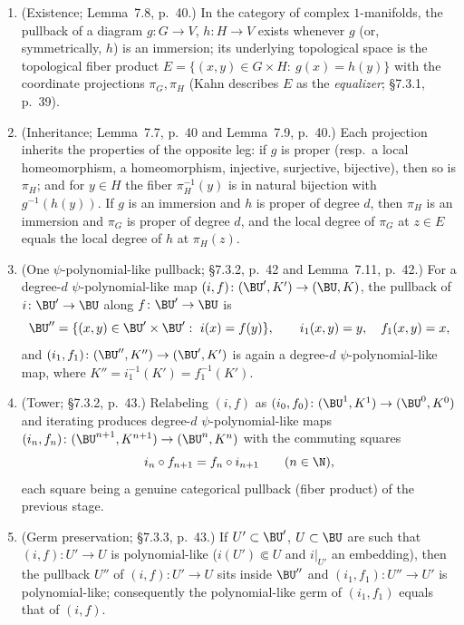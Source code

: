 \begin{proposition}\label{prop:kahn-pullback-tower}
\begin{enumerate}
\item (Existence; Lemma~7.8, p.~40.)  In the category of complex
\(1\)-manifolds, the pullback of a diagram \(g\colon G\to V\),
\(h\colon H\to V\) exists whenever \(g\) (or, symmetrically, \(h\)) is
an immersion; its underlying topological space is the topological
fiber product
\(E=\{(x,y)\in G\times H:\ g(x)=h(y)\}\)
with the coordinate projections \(\pi_G,\pi_H\) (Kahn describes \(E\)
as the \emph{equalizer}; \S7.3.1, p.~39).
\item (Inheritance; Lemma~7.7, p.~40 and Lemma~7.9, p.~40.)  Each projection inherits
the properties of the opposite leg: if \(g\) is proper (resp.\ a local
homeomorphism, a homeomorphism, injective, surjective, bijective),
then so is \(\pi_H\); and for \(y\in H\) the fiber \(\pi_H^{-1}(y)\)
is in natural bijection with \(g^{-1}(h(y))\).  If \(g\) is an
immersion and \(h\) is proper of degree \(d\), then \(\pi_H\) is an
immersion and \(\pi_G\) is proper of degree \(d\), and the local
degree of \(\pi_G\) at \(z\in E\) equals the local degree of \(h\) at
\(\pi_H(z)\).
\item (One \(\psi\)-polynomial-like pullback; \S7.3.2, p.~42 and Lemma~7.11, p.~42.)  For a
degree-\(d\) \(\psi\)-polynomial-like map
\((i,f)\colon(\BU',K')\to(\BU,K)\), the pullback of
\(i\colon\BU'\to\BU\) along \(f\colon\BU'\to\BU\) is
\[
 \BU''=\{(x,y)\in\BU'\times\BU':\ i(x)=f(y)\},\qquad
 i_1(x,y)=y,\quad f_1(x,y)=x,
\]
and \((i_1,f_1)\colon(\BU'',K'')\to(\BU',K')\) is again a
degree-\(d\) \(\psi\)-polynomial-like map, where
\(K''=i_1^{-1}(K')=f_1^{-1}(K')\).
\item (Tower; \S7.3.2, p.~43.)  Relabeling \((i,f)\) as
\((i_0,f_0)\colon(\BU^1,K^1)\to(\BU^0,K^0)\) and iterating produces
degree-\(d\) \(\psi\)-polynomial-like maps
\((i_n,f_n)\colon(\BU^{n+1},K^{n+1})\to(\BU^n,K^n)\) with the
commuting squares
\[
 i_n\circ f_{n+1}=f_n\circ i_{n+1}\qquad(n\in\N),
\]
each square being a genuine categorical pullback (fiber product) of
the previous stage.
\item (Germ preservation; \S7.3.3, p.~43.)  If \(U'\subset\BU'\),
\(U\subset\BU\) are such that \((i,f)\colon U'\to U\) is
polynomial-like (\(i(U')\Subset U\) and \(i|_{U'}\) an embedding),
then the pullback \(U''\) of \((i,f)\colon U'\to U\) sits inside
\(\BU''\) and \((i_1,f_1)\colon U''\to U'\) is polynomial-like;
consequently the polynomial-like germ of \((i_1,f_1)\) equals that of
\((i,f)\).
\end{enumerate}
\end{proposition}

